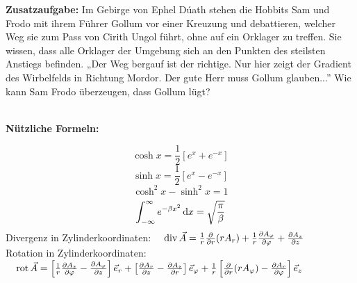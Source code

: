 \documentclass{atistandalonetask}
\begin{document}
\begin{atiTask}[
	title = Weitere Fragen
]
\textbf{Zusatzaufgabe:} Im Gebirge von Ephel Dúath stehen die Hobbits Sam und Frodo mit ihrem Führer Gollum vor einer Kreuzung und debattieren, welcher Weg sie zum Pass von Cirith Ungol führt, ohne auf ein Orklager zu treffen. Sie wissen, dass alle Orklager der Umgebung sich an den Punkten des steilsten Anstiegs befinden. „Der Weg bergauf ist der richtige. Nur hier zeigt der Gradient des Wirbelfelds in Richtung Mordor. Der gute Herr muss Gollum glauben...” Wie kann Sam Frodo überzeugen, dass Gollum lügt? 

~\\[0.6cm]
\textbf{Nützliche Formeln:}

\[\cosh x =\frac{1}{2}[e^x+e^{-x}]
\]
\[\sinh x =\frac{1}{2}[e^x-e^{-x}]
\]
\[
\cosh^2 x- \sinh^2 x=1
\]
\[
\int_{-\infty}^{\infty} e^{-\beta x^2}\,\mathrm{d} x=\sqrt{\frac{\pi}{\beta}}
\]
Divergenz in Zylinderkoordinaten: $\quad \divergence \vec{A} = \frac{1}{r} \leibnizPartialDerivative{}{r} (rA_r) + \frac{1}{r} \leibnizPartialDerivative{A_\varphi}{\varphi} + \leibnizPartialDerivative{A_z}{z}$ \\[0.2cm]
Rotation in Zylinderkoordinaten: $\quad \curl \vec{A} = \left[ \frac{1}{r} \leibnizPartialDerivative{A_z}{\varphi} - \leibnizPartialDerivative{A_\varphi}{z} \right]\vec{e}_r + \left[ \leibnizPartialDerivative{A_r}{z} - \leibnizPartialDerivative{A_z}{r} \right] \vec{e}_\varphi + \frac{1}{r} \left[ \leibnizPartialDerivative{}{r} (rA_\varphi) - \leibnizPartialDerivative{A_r}{\varphi} \right] \vec{e}_z$ \\

\end{atiTask}
\end{document}
